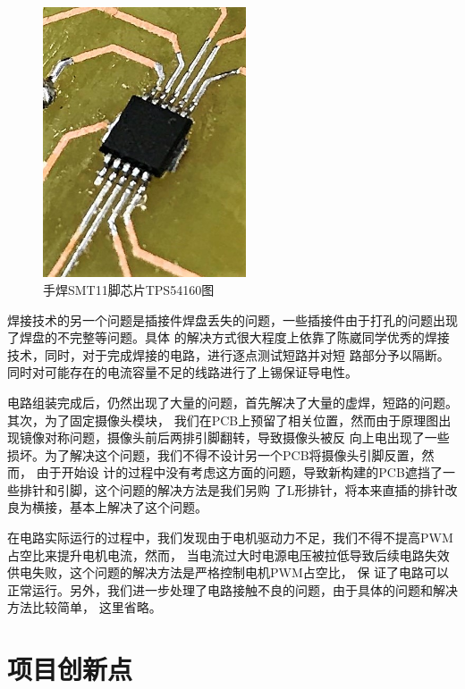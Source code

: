 \documentclass[a4paper]{paper}
\begin{document}
\begin{figure}
    \centering
    \includegraphics[width = 60mm]{SMT.jpg}
    \caption{手焊SMT11脚芯片TPS54160图}
    \label{ex}
\end{figure}
焊接技术的另一个问题是插接件焊盘丢失的问题，一些插接件由于打孔的问题出现了焊盘的不完整等问题。具体
的解决方式很大程度上依靠了陈崴同学优秀的焊接技术，同时，对于完成焊接的电路，进行逐点测试短路并对短
路部分予以隔断。同时对可能存在的电流容量不足的线路进行了上锡保证导电性。

电路组装完成后，仍然出现了大量的问题，首先解决了大量的虚焊，短路的问题。其次，为了固定摄像头模块，
我们在PCB上预留了相关位置，然而由于原理图出现镜像对称问题，摄像头前后两排引脚翻转，导致摄像头被反
向上电出现了一些损坏。为了解决这个问题，我们不得不设计另一个PCB将摄像头引脚反置，然而， 由于开始设
计的过程中没有考虑这方面的问题，导致新构建的PCB遮挡了一些排针和引脚，这个问题的解决方法是我们另购
了L形排针，将本来直插的排针改良为横接，基本上解决了这个问题。

在电路实际运行的过程中，我们发现由于电机驱动力不足，我们不得不提高PWM占空比来提升电机电流，然而，
当电流过大时电源电压被拉低导致后续电路失效供电失败，这个问题的解决方法是严格控制电机PWM占空比， 保
证了电路可以正常运行。另外，我们进一步处理了电路接触不良的问题，由于具体的问题和解决方法比较简单，
这里省略。
\section{项目创新点}
\end{document}
